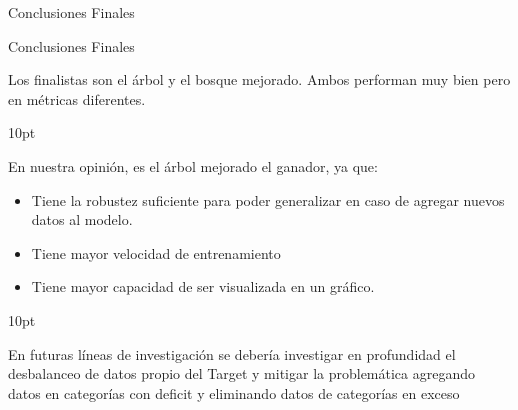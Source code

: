 \documentclass[pdf]{beamer}
\def\vspace{}%
\begin{document}
{\begin{frame}{Conclusiones Finales}
\end{frame}


\begin{frame}{Conclusiones Finales}

    Los finalistas son el árbol y el bosque mejorado. Ambos performan muy bien pero en métricas diferentes. 

\vspace{10pt} 

    En nuestra opinión, es el árbol mejorado el ganador, ya que:
    \begin{itemize}
        \item Tiene la robustez suficiente para poder generalizar en caso de agregar nuevos datos al modelo. 
        \item Tiene mayor velocidad de entrenamiento 
        \item Tiene mayor capacidad de ser visualizada en un gráfico.
    \end{itemize}

\vspace{10pt} 

    En futuras líneas de investigación se debería investigar en profundidad el desbalanceo de datos propio del Target y mitigar la problemática agregando datos en categorías con deficit y eliminando datos de categorías en exceso
    

\end{frame}
}
\end{document}
